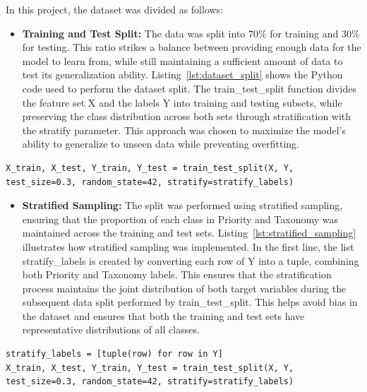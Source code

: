 In this project, the dataset was divided as follows:

\begin{itemize}
    \item \textbf{Training and Test Split:} The data was split into 70\% for training and 30\% for testing. This ratio strikes a balance between providing enough data for the model to learn from, while still maintaining a sufficient amount of data to test its generalization ability. Listing~\ref{lst:dataset_split} shows the Python code used to perform the dataset split. The train\_test\_split function divides the feature set X and the labels Y into training and testing subsets, while preserving the class distribution across both sets through stratification with the stratify parameter. This approach was chosen to maximize the model's ability to generalize to unseen data while preventing overfitting.
\end{itemize}

\vspace{0.2cm}
\noindent
\begin{minipage}{\linewidth}
\begin{verbatim}
X_train, X_test, Y_train, Y_test = train_test_split(X, Y, test_size=0.3, random_state=42, stratify=stratify_labels)
\end{verbatim}
\label{lst:dataset_split}
\end{minipage}
\vspace{0.1cm}

\begin{itemize}
    \item \textbf{Stratified Sampling:} The split was performed using stratified sampling, ensuring that the proportion of each class in Priority and Taxonomy was maintained across the training and test sets. Listing~\ref{lst:stratified_sampling} illustrates how stratified sampling was implemented. In the first line, the list stratify\_labels is created by converting each row of Y into a tuple, combining both Priority and Taxonomy labels. This ensures that the stratification process maintains the joint distribution of both target variables during the subsequent data split performed by train\_test\_split. This helps avoid bias in the dataset and ensures that both the training and test sets have representative distributions of all classes.
\end{itemize}

\vspace{0.2cm}
\noindent
\begin{minipage}{\linewidth}
\begin{verbatim}
stratify_labels = [tuple(row) for row in Y]
X_train, X_test, Y_train, Y_test = train_test_split(X, Y, test_size=0.3, random_state=42, stratify=stratify_labels)
\end{verbatim}
\label{lst:stratified_sampling}
\end{minipage}
\vspace{0.1cm}

